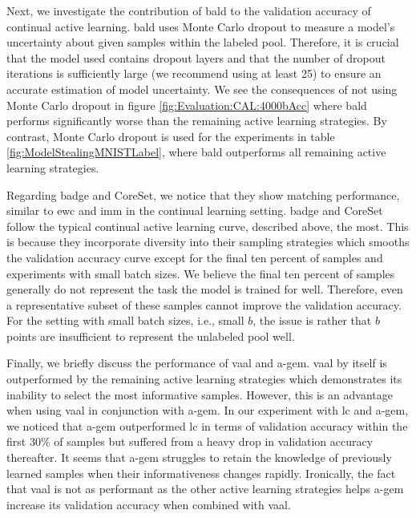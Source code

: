 Next, we investigate the contribution of \gls{bald} to the validation accuracy of continual active learning. \gls{bald} uses Monte Carlo dropout to measure a 
model's uncertainty about given samples within the labeled pool. Therefore, it is crucial that the model used contains dropout layers and that the number of dropout 
iterations is sufficiently large (we recommend using at least 25) to ensure an accurate estimation of model uncertainty. We see the consequences of 
not using Monte Carlo dropout in figure \ref{fig:Evaluation:CAL:4000bAcc} where \gls{bald} performs significantly worse than the remaining active learning
strategies. By contrast, Monte Carlo dropout is used for the experiments in table \ref{fig:ModelStealingMNISTLabel}, where \gls{bald} outperforms all remaining
active learning strategies. \par
Regarding \gls{badge} and CoreSet, we notice that they show matching performance, similar to \gls{ewc} and \gls{imm} in the continual learning setting. \gls{badge}
and CoreSet follow the typical continual active learning curve, described above, the most. This is because they incorporate diversity into their
sampling strategies which smooths the validation accuracy curve except for the final ten percent of samples and experiments with small batch sizes. We believe the
final ten percent of samples generally do not represent the task the model is trained for well. Therefore, even a representative subset of these samples cannot
improve the validation accuracy. For the setting with small batch sizes, i.e., small $b$, the issue is rather that $b$ points are insufficient to represent
the unlabeled pool well. \par
Finally, we briefly discuss the performance of \gls{vaal} and \gls{a-gem}. \gls{vaal} by itself is outperformed by the remaining active
learning strategies which demonstrates its inability to select the most informative samples. However, this is an advantage when using \gls{vaal} in conjunction
with \gls{a-gem}. In our experiment with \gls{lc} and \gls{a-gem}, we noticed that \gls{a-gem} outperformed \gls{lc} in terms of validation accuracy within the first 30\%
of samples but suffered from a heavy drop in validation accuracy thereafter. It seems that \gls{a-gem} struggles to retain the knowledge of previously learned samples when
their informativeness changes rapidly. Ironically, the fact that \gls{vaal} is not as performant as the other active learning strategies helps \gls{a-gem} increase its
validation accuracy when combined with \gls{vaal}. \par

